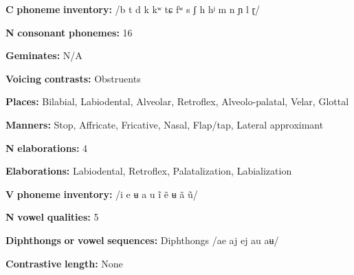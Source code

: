 \documentclass[output=paper]{langsci/langscibook}
\begin{document}
\begin{styleBody}
\textbf{C} \textbf{phoneme} \textbf{inventory:} /b t d k kʷ tɕ fʷ s ʃ h hʲ m n ɲ l ɽ/
\end{styleBody}

\begin{styleBody}
\textbf{N} \textbf{consonant} \textbf{phonemes:} 16
\end{styleBody}

\begin{styleBody}
\textbf{Geminates:} N/A
\end{styleBody}

\begin{styleBody}
\textbf{Voicing} \textbf{contrasts:} Obstruents
\end{styleBody}

\begin{styleBody}
\textbf{Places:} Bilabial, Labiodental, Alveolar, Retroflex, Alveolo-palatal, Velar, Glottal
\end{styleBody}

\begin{styleBody}
\textbf{Manners:} Stop, Affricate, Fricative, Nasal, Flap/tap, Lateral approximant
\end{styleBody}

\begin{styleBody}
\textbf{N} \textbf{elaborations:} 4
\end{styleBody}

\begin{styleBody}
\textbf{Elaborations:} Labiodental, Retroflex, Palatalization, Labialization
\end{styleBody}

\begin{styleBody}
\textbf{V} \textbf{phoneme} \textbf{inventory:} /i e ʉ a u ĩ ẽ ʉ ã ũ/
\end{styleBody}

\begin{styleBody}
\textbf{N} \textbf{vowel} \textbf{qualities:} 5
\end{styleBody}

\begin{styleBody}
\textbf{Diphthongs} \textbf{or} \textbf{vowel} \textbf{sequences:} Diphthongs /ae aj ej au aʉ/
\end{styleBody}

\begin{styleBody}
\textbf{Contrastive} \textbf{length:} None
\end{styleBody}
\end{document}
